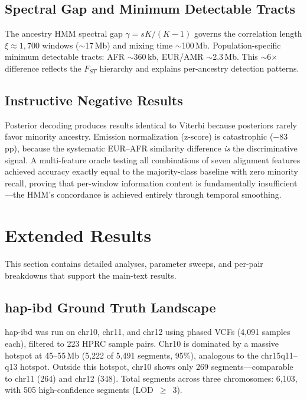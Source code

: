 \documentclass[11pt]{article}
\begin{document}
\subsection{Spectral Gap and Minimum Detectable Tracts}
\label{sec:supp_spectral}

The ancestry HMM spectral gap $\gamma = sK/(K-1)$ governs the correlation length $\xi \approx 1{,}700$ windows ($\sim$17\,Mb) and mixing time $\sim$100\,Mb. Population-specific minimum detectable tracts: AFR $\sim$360\,kb, EUR/AMR $\sim$2.3\,Mb. This $\sim$6$\times$ difference reflects the $F_{ST}$ hierarchy and explains per-ancestry detection patterns.

\subsection{Instructive Negative Results}
\label{sec:supp_negative}

Posterior decoding produces results identical to Viterbi because posteriors rarely favor minority ancestry. Emission normalization (z-score) is catastrophic ($-$83\,pp), because the systematic EUR--AFR similarity difference \emph{is} the discriminative signal. A multi-feature oracle testing all combinations of seven alignment features achieved accuracy exactly equal to the majority-class baseline with zero minority recall, proving that per-window information content is fundamentally insufficient---the HMM's concordance is achieved entirely through temporal smoothing.

\section{Extended Results}
\label{sec:supp_extended_results}

This section contains detailed analyses, parameter sweeps, and per-pair breakdowns that support the main-text results.

\subsection{hap-ibd Ground Truth Landscape}
\label{sec:supp_hapibd_ground_truth}

hap-ibd was run on chr10, chr11, and chr12 using phased VCFs (4,091 samples each), filtered to 223 HPRC sample pairs. Chr10 is dominated by a massive hotspot at 45--55\,Mb (5,222 of 5,491 segments, 95\%), analogous to the chr15q11--q13 hotspot. Outside this hotspot, chr10 shows only 269 segments---comparable to chr11 (264) and chr12 (348). Total segments across three chromosomes: 6,103, with 505 high-confidence segments (LOD~$\geq$~3).
\end{document}
